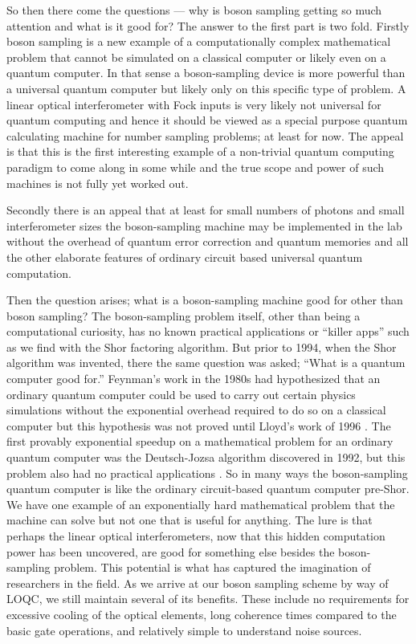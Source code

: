 \documentclass[aps,pra,twocolumn,amsmath,amssymb,nofootinbib,superscriptaddress]{revtex4}
\begin{document}
	So then there come the questions — why is boson sampling getting so much attention and what is it good for? The answer to the first part is two fold. Firstly boson sampling is a new example of a computationally complex mathematical problem that cannot be simulated on a classical computer or likely even on a quantum computer. In that sense a boson-sampling device is more powerful than a universal quantum computer but likely only on this specific type of problem. A linear optical interferometer with Fock inputs is very likely not universal for quantum computing and hence it should be viewed as a special purpose quantum calculating machine for number sampling problems; at least for now. The appeal is that this is the first interesting example of a non-trivial quantum computing paradigm to come along in some while and the true scope and power of such machines is not fully yet worked out. 

	Secondly there is an appeal that at least for small numbers of photons and small interferometer sizes the boson-sampling machine may be implemented in the lab without the overhead of quantum error correction and quantum memories and all the other elaborate features of ordinary circuit based universal quantum computation. 

	Then the question arises; what is a boson-sampling machine good for other than boson sampling? The boson-sampling problem itself, other than being a computational curiosity, has no known practical applications or “killer apps” such as we find with the Shor factoring algorithm. But prior to 1994, when the Shor algorithm was invented, there the same question was asked; “What is a quantum computer good for.” Feynman’s work in the 1980s had hypothesized that an ordinary quantum computer could be used to carry out certain physics simulations without the exponential overhead required to do so on a classical computer but this hypothesis was not proved until Lloyd’s work of 1996 \cite{feyn,lloyd}. The first provably exponential speedup on a mathematical problem for an ordinary quantum computer was the Deutsch-Jozsa algorithm discovered in 1992, but this problem also had no practical applications \cite{deutsch}. So in many ways the boson-sampling quantum computer is like the ordinary circuit-based quantum computer pre-Shor. We have one example of an exponentially hard mathematical problem that the machine can solve but not one that is useful for anything. The lure is that perhaps the linear optical interferometers, now that this hidden computation power has been uncovered, are good for something else besides the boson-sampling problem. This potential is what has captured the imagination of researchers in the field. As we arrive at our boson sampling scheme by way of LOQC, we still maintain several of its benefits. These include no requirements for excessive cooling of the optical elements, long coherence times compared to the basic gate operations, and relatively simple to understand noise sources.
\end{document}
